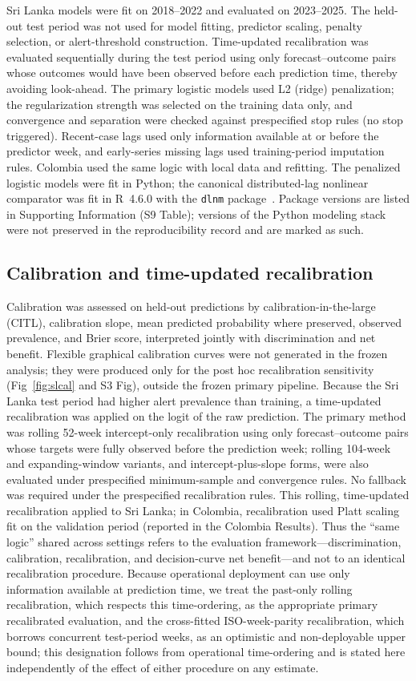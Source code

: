 \documentclass[11pt,a4paper]{article}
\begin{document}
Sri Lanka models were fit on 2018--2022 and evaluated on 2023--2025. The held-out test period was not used for model fitting, predictor scaling, penalty selection, or alert-threshold construction. Time-updated recalibration was evaluated sequentially during the test period using only forecast--outcome pairs whose outcomes would have been observed before each prediction time, thereby avoiding look-ahead. The primary logistic models used L2 (ridge) penalization; the regularization strength was selected on the training data only, and convergence and separation were checked against prespecified stop rules (no stop triggered). Recent-case lags used only information available at or before the predictor week, and early-series missing lags used training-period imputation rules. Colombia used the same logic with local data and refitting. The penalized logistic models were fit in Python; the canonical distributed-lag nonlinear comparator was fit in R~4.6.0 with the \texttt{dlnm} package~\cite{RCoreTeam2026,Gasparrini2011}. Package versions are listed in Supporting Information (S9 Table); versions of the Python modeling stack were not preserved in the reproducibility record and are marked as such.

\subsection{Calibration and time-updated recalibration}
Calibration was assessed on held-out predictions by calibration-in-the-large (CITL), calibration slope, mean predicted probability where preserved, observed prevalence, and Brier score, interpreted jointly with discrimination and net benefit. Flexible graphical calibration curves were not generated in the frozen analysis; they were produced only for the post hoc recalibration sensitivity (Fig~\ref{fig:slcal} and S3 Fig), outside the frozen primary pipeline. Because the Sri Lanka test period had higher alert prevalence than training, a time-updated recalibration was applied on the logit of the raw prediction. The primary method was rolling 52-week intercept-only recalibration using only forecast--outcome pairs whose targets were fully observed before the prediction week; rolling 104-week and expanding-window variants, and intercept-plus-slope forms, were also evaluated under prespecified minimum-sample and convergence rules. No fallback was required under the prespecified recalibration rules. This rolling, time-updated recalibration applied to Sri Lanka; in Colombia, recalibration used Platt scaling fit on the validation period (reported in the Colombia Results). Thus the ``same logic'' shared across settings refers to the evaluation framework---discrimination, calibration, recalibration, and decision-curve net benefit---and not to an identical recalibration procedure. Because operational deployment can use only information available at prediction time, we treat the past-only rolling recalibration, which respects this time-ordering, as the appropriate primary recalibrated evaluation, and the cross-fitted ISO-week-parity recalibration, which borrows concurrent test-period weeks, as an optimistic and non-deployable upper bound; this designation follows from operational time-ordering and is stated here independently of the effect of either procedure on any estimate.
\end{document}
